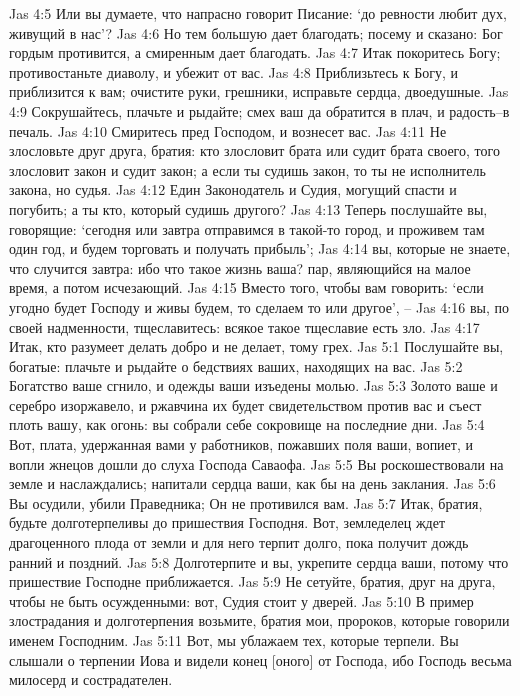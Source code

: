 Jas 4:5  Или вы думаете, что напрасно говорит Писание: `до ревности любит дух, живущий в нас'?
Jas 4:6  Но тем большую дает благодать; посему и сказано: Бог гордым противится, а смиренным дает благодать.
Jas 4:7  Итак покоритесь Богу; противостаньте диаволу, и убежит от вас.
Jas 4:8  Приблизьтесь к Богу, и приблизится к вам; очистите руки, грешники, исправьте сердца, двоедушные.
Jas 4:9  Сокрушайтесь, плачьте и рыдайте; смех ваш да обратится в плач, и радость--в печаль.
Jas 4:10  Смиритесь пред Господом, и вознесет вас.
Jas 4:11  Не злословьте друг друга, братия: кто злословит брата или судит брата своего, того злословит закон и судит закон; а если ты судишь закон, то ты не исполнитель закона, но судья.
Jas 4:12  Един Законодатель и Судия, могущий спасти и погубить; а ты кто, который судишь другого?
Jas 4:13  Теперь послушайте вы, говорящие: `сегодня или завтра отправимся в такой-то город, и проживем там один год, и будем торговать и получать прибыль';
Jas 4:14  вы, которые не знаете, что случится завтра: ибо что такое жизнь ваша? пар, являющийся на малое время, а потом исчезающий.
Jas 4:15  Вместо того, чтобы вам говорить: `если угодно будет Господу и живы будем, то сделаем то или другое', --
Jas 4:16  вы, по своей надменности, тщеславитесь: всякое такое тщеславие есть зло.
Jas 4:17  Итак, кто разумеет делать добро и не делает, тому грех.
Jas 5:1  Послушайте вы, богатые: плачьте и рыдайте о бедствиях ваших, находящих на вас.
Jas 5:2  Богатство ваше сгнило, и одежды ваши изъедены молью.
Jas 5:3  Золото ваше и серебро изоржавело, и ржавчина их будет свидетельством против вас и съест плоть вашу, как огонь: вы собрали себе сокровище на последние дни.
Jas 5:4  Вот, плата, удержанная вами у работников, пожавших поля ваши, вопиет, и вопли жнецов дошли до слуха Господа Саваофа.
Jas 5:5  Вы роскошествовали на земле и наслаждались; напитали сердца ваши, как бы на день заклания.
Jas 5:6  Вы осудили, убили Праведника; Он не противился вам.
Jas 5:7  Итак, братия, будьте долготерпеливы до пришествия Господня. Вот, земледелец ждет драгоценного плода от земли и для него терпит долго, пока получит дождь ранний и поздний.
Jas 5:8  Долготерпите и вы, укрепите сердца ваши, потому что пришествие Господне приближается.
Jas 5:9  Не сетуйте, братия, друг на друга, чтобы не быть осужденными: вот, Судия стоит у дверей.
Jas 5:10  В пример злострадания и долготерпения возьмите, братия мои, пророков, которые говорили именем Господним.
Jas 5:11  Вот, мы ублажаем тех, которые терпели. Вы слышали о терпении Иова и видели конец [оного] от Господа, ибо Господь весьма милосерд и сострадателен.
